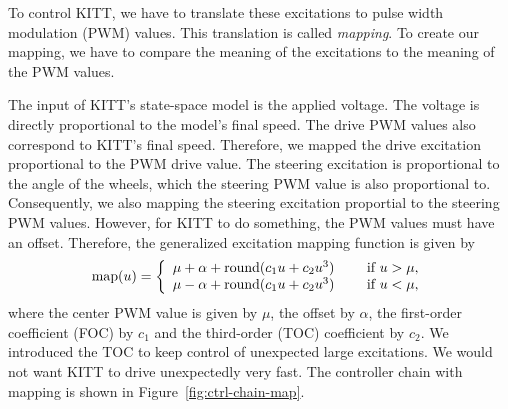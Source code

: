 \documentclass[11pt,titlepage]{report}
\begin{document}
To control KITT, we have to translate these excitations to pulse width modulation (PWM) values. This translation is called \textit{mapping}. To create our mapping, we have to compare the meaning of the excitations to the meaning of the PWM values.

The input of KITT's state-space model is the applied voltage. The voltage is directly proportional to the model's final speed. The drive PWM values also correspond to KITT's final speed. Therefore, we mapped the drive excitation proportional to the PWM drive value. The steering excitation is proportional to the angle of the wheels, which the steering PWM value is also proportional to. Consequently, we also mapping the steering excitation proportial to the steering PWM values. However, for KITT to do something, the PWM values must have an offset. Therefore, the generalized excitation mapping function is given by
\begin{equation} \label{eq:ctrl-mapping}
	\text{map}(u) = \left\{ \begin{array}{l l}
		\mu + \alpha + \text{round}(c_1 u + c_2 u^3) & \quad \text{ if } u > \mu, \\
		\mu - \alpha + \text{round}(c_1 u + c_2 u^3) & \quad \text{ if } u < \mu,
	\end{array} \right.
\end{equation}
where the center PWM value is given by $\mu$, the offset by $\alpha$, the first-order coefficient (FOC) by $c_1$ and the third-order (TOC) coefficient by $c_2$. We introduced the TOC to keep control of unexpected large excitations. We would not want KITT to drive unexpectedly very fast. The controller chain with mapping is shown in Figure~\ref{fig:ctrl-chain-map}.
\end{document}
